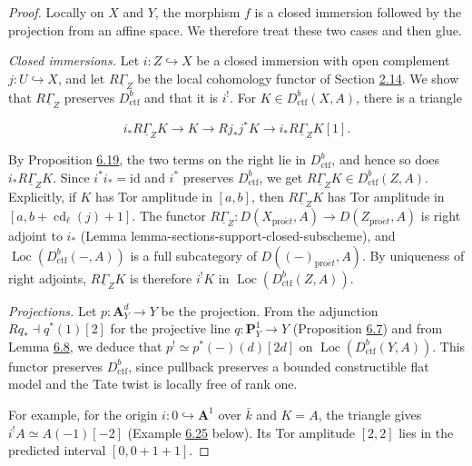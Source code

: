 \documentclass[11pt]{article}
\providecommand{\Loc}{}\renewcommand{\Loc}{\operatorname{Loc}}
\begin{document}
\begin{proof}[{Proof}]\label{bp574}%
Locally on \(X\) and \(Y\), the morphism \(f\) is a closed immersion followed by the projection from an affine space. We therefore treat these two cases and then glue.

\emph{Closed immersions.} Let \(i:Z\hookrightarrow X\) be a closed immersion with open complement \(j:U\hookrightarrow X\), and let \(R\underline\Gamma_Z\) be the local cohomology functor of Section \hyperref[bp179]{2.14}. We show that \(R\underline\Gamma_Z\) preserves \(D^b_{\mathrm{ctf}}\) and that it is \(i^!\). For \(K\in D^b_{\mathrm{ctf}}(X,A)\), there is a triangle

\[
i_*R\underline\Gamma_ZK\longrightarrow K\longrightarrow Rj_*j^*K
\longrightarrow i_*R\underline\Gamma_ZK[1].
\]

By Proposition \hyperref[bp570]{6.19}, the two terms on the right lie in \(D^b_{\mathrm{ctf}}\), and hence so does \(i_*R\underline\Gamma_ZK\). Since \(i^*i_*=\mathrm{id}\) and \(i^*\) preserves \(D^b_{\mathrm{ctf}}\), we get \(R\underline\Gamma_ZK\in D^b_{\mathrm{ctf}}(Z,A)\). Explicitly, if \(K\) has Tor amplitude in \([a,b]\), then \(R\underline\Gamma_ZK\) has Tor amplitude in \([a,b+\operatorname{cd}_\ell(j)+1]\). The functor \(R\underline\Gamma_Z:D(X_{\mathrm{pro}\acute{e}t},A)\to D(Z_{\mathrm{pro}\acute{e}t},A)\) is right adjoint to \(i_*\) (Lemma lemma-sections-support-closed-subscheme), and \(\Loc(D^b_{\mathrm{ctf}}(-,A))\) is a full subcategory of \(D((-)_{\mathrm{pro}\acute{e}t},A)\). By uniqueness of right adjoints, \(R\underline\Gamma_ZK\) is therefore \(i^!K\) in \(\Loc(D^b_{\mathrm{ctf}}(Z,A))\).

\emph{Projections.} Let \(p:\mathbf A^d_Y\to Y\) be the projection. From the adjunction \(Rq_*\dashv q^*(1)[2]\) for the projective line \(q:\mathbf P^1_Y\to Y\) (Proposition \hyperref[bp534]{6.7}) and from Lemma \hyperref[bp538]{6.8}, we deduce that \(p^!\simeq p^*(-)(d)[2d]\) on \(\Loc(D^b_{\mathrm{ctf}}(Y,A))\). This functor preserves \(D^b_{\mathrm{ctf}}\), since pullback preserves a bounded constructible flat model and the Tate twist is locally free of rank one.

For example, for the origin \(i:0\hookrightarrow\mathbf A^1\) over \(\bar k\) and \(K=A\), the triangle gives \(i^!A\simeq A(-1)[-2]\) (Example \hyperref[bp591]{6.25} below). Its Tor amplitude \([2,2]\) lies in the predicted interval \([0,0+1+1]\).


\end{proof}
\end{document}
